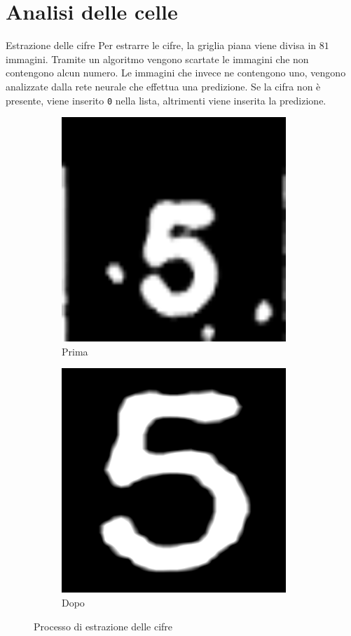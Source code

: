 \documentclass[10pt]{beamer}
\begin{document}
\section{Analisi delle celle}
\begin{frame}[fragile]{Estrazione delle cifre}
    Per estrarre le cifre, la griglia piana viene divisa in \(81\) immagini.
    Tramite un algoritmo vengono scartate le immagini che non contengono alcun
    numero. Le immagini che invece ne contengono uno, vengono analizzate dalla
    rete neurale che effettua una predizione.
    Se la cifra non è presente, viene inserito \texttt{0} nella lista,
    altrimenti viene inserita la predizione.
%
    \begin{figure}
        \def\subwidth{0.50}
        \def\imgwidth{0.50}
        \centering
        \begin{subfigure}[b]{\subwidth\linewidth}
            \centering
            \includegraphics[width=\imgwidth\linewidth]{imgs/cell_pre.png}
            \caption{Prima}\label{subfig:cell_pre}
        \end{subfigure}%
        \begin{subfigure}[b]{\subwidth\linewidth}
            \centering
            \includegraphics[width=\imgwidth\linewidth]{imgs/cell_post.png}
            \caption{Dopo}\label{subfig:cell_post}
        \end{subfigure}
        \caption{Processo di estrazione delle cifre}\label{fig:extraction}
    \end{figure}
\end{frame}
\end{document}
